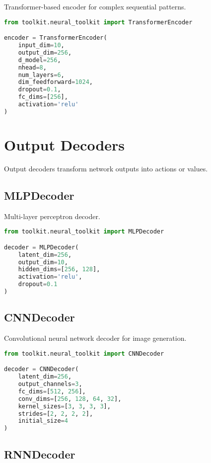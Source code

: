 Transformer-based encoder for complex sequential patterns.

\begin{lstlisting}[language=python, caption=Transformer Encoder]
from toolkit.neural_toolkit import TransformerEncoder

encoder = TransformerEncoder(
    input_dim=10,
    output_dim=256,
    d_model=256,
    nhead=8,
    num_layers=6,
    dim_feedforward=1024,
    dropout=0.1,
    fc_dims=[256],
    activation='relu'
)
\end{lstlisting}

\section{Output Decoders}

Output decoders transform network outputs into actions or values.

\subsection{MLPDecoder}

Multi-layer perceptron decoder.

\begin{lstlisting}[language=python, caption=MLP Decoder]
from toolkit.neural_toolkit import MLPDecoder

decoder = MLPDecoder(
    latent_dim=256,
    output_dim=10,
    hidden_dims=[256, 128],
    activation='relu',
    dropout=0.1
)
\end{lstlisting}

\subsection{CNNDecoder}

Convolutional neural network decoder for image generation.

\begin{lstlisting}[language=python, caption=CNN Decoder]
from toolkit.neural_toolkit import CNNDecoder

decoder = CNNDecoder(
    latent_dim=256,
    output_channels=3,
    fc_dims=[512, 256],
    conv_dims=[256, 128, 64, 32],
    kernel_sizes=[3, 3, 3, 3],
    strides=[2, 2, 2, 2],
    initial_size=4
)
\end{lstlisting}

\subsection{RNNDecoder}

